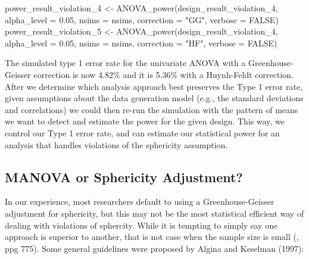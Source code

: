 \documentclass[
]{book}
\newenvironment{Shaded}{\begin{snugshade}}{\end{snugshade}}
\newcommand{\AttributeTok}[1]{\textcolor[rgb]{0.77,0.63,0.00}{#1}}
\newcommand{\ConstantTok}[1]{\textcolor[rgb]{0.00,0.00,0.00}{#1}}
\newcommand{\FloatTok}[1]{\textcolor[rgb]{0.00,0.00,0.81}{#1}}
\newcommand{\FunctionTok}[1]{\textcolor[rgb]{0.00,0.00,0.00}{#1}}
\newcommand{\NormalTok}[1]{#1}
\newcommand{\OtherTok}[1]{\textcolor[rgb]{0.56,0.35,0.01}{#1}}
\newcommand{\StringTok}[1]{\textcolor[rgb]{0.31,0.60,0.02}{#1}}
\begin{document}
\begin{Shaded}
\begin{Highlighting}[]
\NormalTok{power\_result\_violation\_4 }\OtherTok{\textless{}{-}} \FunctionTok{ANOVA\_power}\NormalTok{(design\_result\_violation\_4, }
                                        \AttributeTok{alpha\_level =} \FloatTok{0.05}\NormalTok{, }
                                        \AttributeTok{nsims =}\NormalTok{ nsims,}
                                        \AttributeTok{correction =} \StringTok{"GG"}\NormalTok{,}
                                        \AttributeTok{verbose =} \ConstantTok{FALSE}\NormalTok{)}
\NormalTok{power\_result\_violation\_5 }\OtherTok{\textless{}{-}} \FunctionTok{ANOVA\_power}\NormalTok{(design\_result\_violation\_4, }
                                        \AttributeTok{alpha\_level =} \FloatTok{0.05}\NormalTok{, }
                                        \AttributeTok{nsims =}\NormalTok{ nsims,}
                                        \AttributeTok{correction =} \StringTok{"HF"}\NormalTok{,}
                                        \AttributeTok{verbose =} \ConstantTok{FALSE}\NormalTok{)}
\end{Highlighting}
\end{Shaded}

The simulated type 1 error rate for the univariate ANOVA with a Greenhouse-Geisser correction is now 4.82\% and it is 5.36\% with a Huynh-Feldt correction.
After we determine which analysis approach best preserves the Type 1 error rate, given assumptions about the data generation model (e.g., the standard deviations and correlations) we could then re-run the simulation with the pattern of means we want to detect and estimate the power for the given design.
This way, we control our Type 1 error rate, and can estimate our statistical power for an analysis that handles violations of the sphericity assumption.

\newpage

\hypertarget{manova-or-sphericity-adjustment}{%
\subsection{MANOVA or Sphericity Adjustment?}\label{manova-or-sphericity-adjustment}}

In our experience, most researchers default to using a Greenhouse-Geisser adjustment for sphericity, but this may not be the most statistical efficient way of dealing with violations of sphercity. While it is tempting to simply say one approach is superior to another, that is not case when the sample size is small (\citet{maxwell_designing_2004}, ppg 775).
Some general guidelines were proposed by Algina and Keselman (1997):
\end{document}
